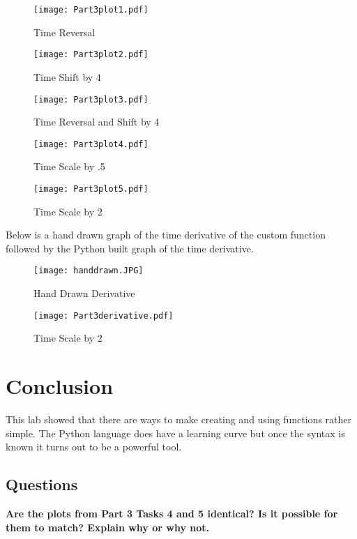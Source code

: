 \documentclass{article}
\begin{document}
\begin{figure}[!]
\centering
\texttt{[image: Part3plot1.pdf]}
\caption{Time Reversal}
\label{fig:Step and Ramp Functions}
\end{figure}

\begin{figure}[!]
\centering
\texttt{[image: Part3plot2.pdf]}
\caption{Time Shift by 4}
\label{fig:Step and Ramp Functions}
\end{figure}


\begin{figure}[!]
\centering
\texttt{[image: Part3plot3.pdf]}
\caption{Time Reversal and Shift by 4}
\label{fig:Step and Ramp Functions}
\end{figure}

\begin{figure}[!]
\centering
\texttt{[image: Part3plot4.pdf]}
\caption{Time Scale by .5}
\label{fig:Step and Ramp Functions}
\end{figure}

\begin{figure}[!]
\centering
\texttt{[image: Part3plot5.pdf]}
\caption{Time Scale by 2}
\label{fig:Step and Ramp Functions}
\end{figure}

Below is a hand drawn graph of the time derivative of the custom function followed by the Python built graph of the time derivative.

\begin{figure}[!]
\centering
\texttt{[image: handdrawn.JPG]}
\caption{Hand Drawn Derivative}
\label{fig:Step and Ramp Functions}
\end{figure}

\begin{figure}[!]
\centering
\texttt{[image: Part3derivative.pdf]}
\caption{Time Scale by 2}
\label{fig:Step and Ramp Functions}
\end{figure}

\newpage

\section*{Conclusion}
This lab showed that there are ways to make creating and using functions rather simple. The Python language does have a learning curve but once the syntax is known it turns out to be a powerful tool.
\subsection*{Questions}
\textbf{Are the plots from Part 3 Tasks 4 and 5 identical? Is it possible for them to match? Explain why or why not.}
\end{document}
